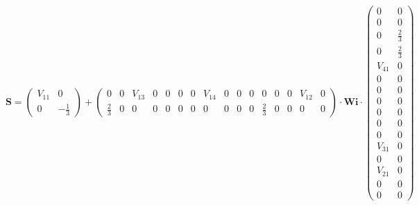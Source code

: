 \[ \mathbf{S} = \left(\begin{smallmatrix} V_{11} & 0 \\ 0 & -\frac{1}{3} \end{smallmatrix}\right) + \left(\begin{smallmatrix} 0 & 0 & V_{13} & 0 & 0 & 0 & 0 & V_{14} & 0 & 0 & 0 & 0 & 0 & 0 & V_{12} & 0 \\ \frac{2}{3} & 0 & 0 & 0 & 0 & 0 & 0 & 0 & 0 & 0 & 0 & \frac{2}{3} & 0 & 0 & 0 & 0 \end{smallmatrix}\right) \cdot \mathbf{Wi} \cdot\left(\begin{smallmatrix} 0 & 0 \\ 0 & 0 \\ 0 & \frac{2}{3} \\ 0 & \frac{2}{3} \\ V_{41} & 0 \\ 0 & 0 \\ 0 & 0 \\ 0 & 0 \\ 0 & 0 \\ 0 & 0 \\ 0 & 0 \\ V_{31} & 0 \\ 0 & 0 \\ V_{21} & 0 \\ 0 & 0 \\ 0 & 0 \end{smallmatrix}\right) \]
